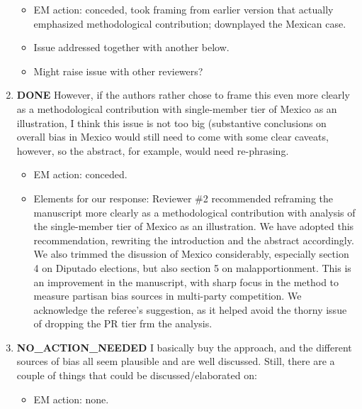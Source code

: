 \documentclass{article}
\begin{document}
\begin{enumerate}
\begin{itemize}
\item EM action: conceded, took framing from earlier version that actually emphasized methodological contribution; downplayed the Mexican case.
\item Issue addressed together with another below.
\item Might raise issue with other reviewers?
\end{itemize}
\item {\bfseries\sffamily DONE} However, if the authors rather chose to frame this even more clearly as a methodological contribution with single-member tier of Mexico as an illustration, I think this issue is not too big (substantive conclusions on overall bias in Mexico would still need to come with some clear caveats, however, so the abstract, for example, would need re-phrasing.
\label{sec:orgheadline8}
\begin{itemize}
\item EM action: conceded.
\item Elements for our response: Reviewer \#2 recommended reframing the manuscript more clearly as a methodological contribution with analysis of the single-member tier of Mexico as an illustration. We have adopted this recommendation, rewriting the introduction and the abstract accordingly. We also trimmed the disussion of Mexico considerably, especially section 4 on Diputado elections, but also section 5 on malapportionment. This is an improvement in the manuscript, with sharp focus in the method to measure partisan bias sources in multi-party competition. We acknowledge the referee's suggestion, as it helped avoid the thorny issue of dropping the PR tier frm the analysis.
\end{itemize}
\item {\bfseries\sffamily NO\_ACTION\_NEEDED} I basically buy the approach, and the different sources of bias all seem plausible and are well discussed. Still, there are a couple of things that could be discussed/elaborated on:
\label{sec:orgheadline9}
\begin{itemize}
\item EM action: none.
\end{itemize}

\end{enumerate}
\end{document}
